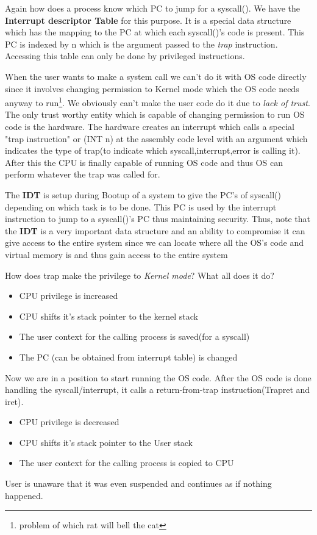 \documentclass[12pt]{article}
\begin{document}
Again how does a process know which PC to jump for a syscall(). We have the \textbf{Interrupt descriptor Table} for this purpose.
It is a special data structure which has the mapping to the PC at which each syscall()'s code is present. This PC is indexed by n which is the 
argument passed to the \textit{trap} instruction. Accessing this table can only be done by privileged instructions.


When the user wants to make a system call we can't do it with OS code directly since it involves changing permission to Kernel mode which the OS code needs anyway to run\footnote{problem of which rat will bell the cat}. We obviously can't make the user
code do it due to \textit{lack of trust}. The only trust worthy entity which is capable of changing permission to run OS code is the hardware. The hardware creates an interrupt which calls a special "trap instruction" or (INT n) at the assembly code level with an argument which indicates the 
type of trap(to indicate which syscall,interrupt,error is calling it). After this the CPU is finally capable of running OS code and thus OS can perform whatever the trap was called for.


The \textbf{IDT} is setup during Bootup of a system to give the PC's of syscall() depending on which task is to be done.
This PC is used by the interrupt instruction to jump to a syscall()'s PC thus maintaining security. Thus, note that the \textbf{IDT} is a very important data structure and 
an ability to compromise it can give access to the entire system since we can locate where all the OS's code and virtual memory is and thus gain access to the entire system 


How does trap make the privilege to \textit{Kernel mode}? What all does it do?
\begin{itemize}[topsep=0pt, partopsep=0pt, itemsep=0pt, parsep=0pt]
    \item CPU privilege is increased
    \item CPU shifts it's stack pointer to the kernel stack
    \item The user context for the calling process is saved(for a syscall)
    \item The PC (can be obtained from interrupt table) is changed 
\end{itemize}


Now we are in a position to start running the OS code. After the OS code is done handling the syscall/interrupt, it calls a return-from-trap
instruction(Trapret and iret).
\begin{itemize}[topsep=0pt, partopsep=0pt, itemsep=0pt, parsep=0pt]
    \item CPU privilege is decreased
    \item CPU shifts it's stack pointer to the User stack
    \item The user context for the calling process is copied to CPU
\end{itemize}
User is unaware that it was even suspended and continues as if nothing happened.
\end{document}
